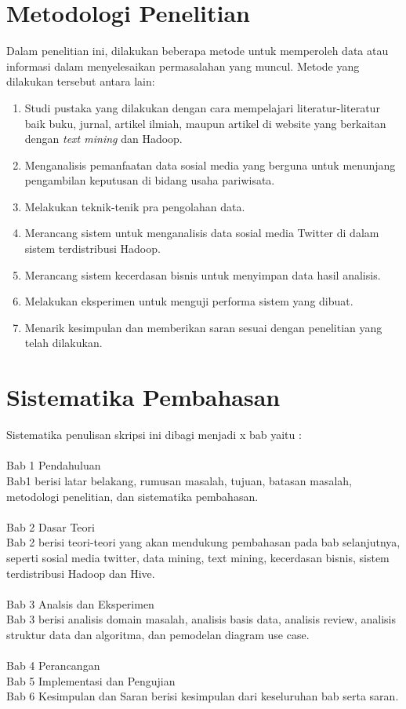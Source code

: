 \section{Metodologi Penelitian}
\label{sec:metodologi_penelitian}
Dalam penelitian ini, dilakukan beberapa metode untuk memperoleh data atau informasi dalam menyelesaikan permasalahan yang muncul. Metode yang dilakukan tersebut antara lain:
\begin{enumerate}
	\item Studi pustaka yang dilakukan dengan cara mempelajari literatur-literatur baik buku, jurnal, artikel ilmiah, maupun artikel di website yang berkaitan dengan  \textit{text mining} dan Hadoop.
	\item Menganalisis pemanfaatan data sosial media yang berguna untuk menunjang pengambilan keputusan di bidang usaha pariwisata.
	\item Melakukan teknik-tenik pra pengolahan data.
	\item Merancang sistem untuk menganalisis data sosial media Twitter di dalam sistem terdistribusi Hadoop.
	\item Merancang sistem kecerdasan bisnis untuk menyimpan data hasil analisis.
	\item Melakukan eksperimen untuk menguji performa sistem yang dibuat.
	\item Menarik kesimpulan dan memberikan saran sesuai dengan penelitian yang telah dilakukan. 
\end{enumerate}

\section{Sistematika Pembahasan}
\label{sec:sistematika_pembahasan}
Sistematika penulisan skripsi ini dibagi menjadi x bab yaitu :\\
 \\
Bab 1 Pendahuluan\\ 
Bab1 berisi latar belakang, rumusan masalah, tujuan, batasan masalah, metodologi penelitian, dan sistematika pembahasan.
\\\\
Bab 2 Dasar Teori\\
Bab 2 berisi teori-teori yang akan mendukung pembahasan pada bab selanjutnya, seperti sosial media twitter, data mining, text mining, kecerdasan bisnis, sistem terdistribusi Hadoop dan Hive. 
\\\\
Bab 3 Analsis dan Eksperimen\\
Bab 3 berisi analisis domain masalah, analisis basis data, analisis review, analisis struktur data dan algoritma, dan pemodelan diagram use case.
\\\\
Bab 4 Perancangan\\
Bab 5 Implementasi dan Pengujian\\
Bab 6 Kesimpulan dan Saran berisi kesimpulan dari keseluruhan bab serta saran.\\
